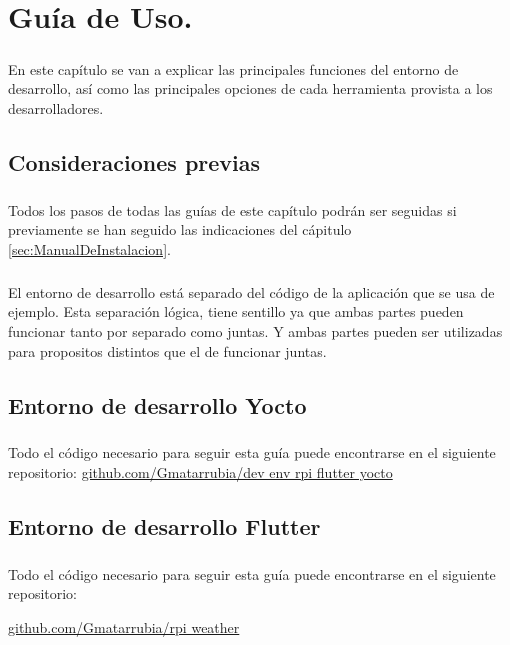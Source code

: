 \chapter{Guía de Uso.}\label{sec:GuiaDeUso}

\paragraph{}En este capítulo se van a explicar las principales funciones del entorno de
desarrollo, así como las principales opciones de cada herramienta provista a los
desarrolladores.

\section{Consideraciones previas}

\paragraph{}Todos los pasos de todas las guías de este capítulo podrán ser seguidas si
previamente se han seguido las indicaciones del cápitulo \ref{sec:ManualDeInstalacion}.

\paragraph{}El entorno de desarrollo está separado del código de la aplicación
que se usa de ejemplo. Esta separación lógica, tiene sentillo ya que ambas partes pueden
funcionar tanto por separado como juntas. Y ambas partes pueden ser utilizadas para
propositos distintos que el de funcionar juntas.

\section{Entorno de desarrollo Yocto}

\paragraph{}Todo el código necesario para seguir esta guía puede encontrarse en el
siguiente repositorio:
\href{https://github.com/Gmatarrubia/dev_env_rpi_flutter_yocto}{github.com/Gmatarrubia/dev env rpi flutter yocto}

\section{Entorno de desarrollo Flutter}

\paragraph{}Todo el código necesario para seguir esta guía puede encontrarse en el
siguiente repositorio:


\href{https://github.com/Gmatarrubia/rpi_weather}{github.com/Gmatarrubia/rpi weather}

